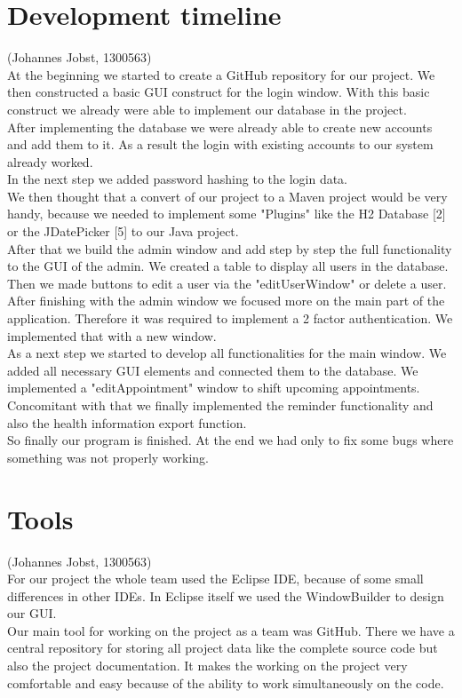 \documentclass[a4paper, 12pt]{report}
\begin{document}
\section{Development timeline}
{\tiny (Johannes Jobst, 1300563)\\}
At the beginning we started to create a GitHub repository for our project. We then constructed a basic GUI construct for the login window. With this basic construct we already were able to implement our database in the project. \\
After implementing the database we were already able to create new accounts and add them to it. As a result the login with existing accounts to our system already worked. \\
In the next step we added password hashing to the login data. \\
We then thought that a convert of our project to a Maven project would be very handy, because we needed to implement some "Plugins" like the H2 Database [2] or the JDatePicker [5] to our Java project.
\\
After that we build the admin window and add step by step the full functionality to the GUI of the admin. We created a table to display all users in the database. Then we made buttons to edit a user via the "editUserWindow" or delete a user.
\\
After finishing with the admin window we focused more on the main part of the application. Therefore it was required to implement a 2 factor authentication. We implemented that with a new window.
\\
As a next step we started to develop all functionalities for the main window. We added all necessary GUI elements and connected them to the database. We implemented a "editAppointment" window to shift upcoming appointments. Concomitant with that we finally implemented the reminder functionality and also the health information export function.
\\
So finally our program is finished. At the end we had only to fix some bugs where something was not properly working. 

\section{Tools}
{\tiny (Johannes Jobst, 1300563)\\}
For our project the whole team used the Eclipse IDE, because of some small differences in other IDEs. In Eclipse itself we used the WindowBuilder to design our GUI.\\
Our main tool for working on the project as a team was GitHub. There we have a central repository for storing all project data like the complete source code but also the project documentation. It makes the working on the project very comfortable and easy because of the ability to work simultaneously on the code.
\end{document}
